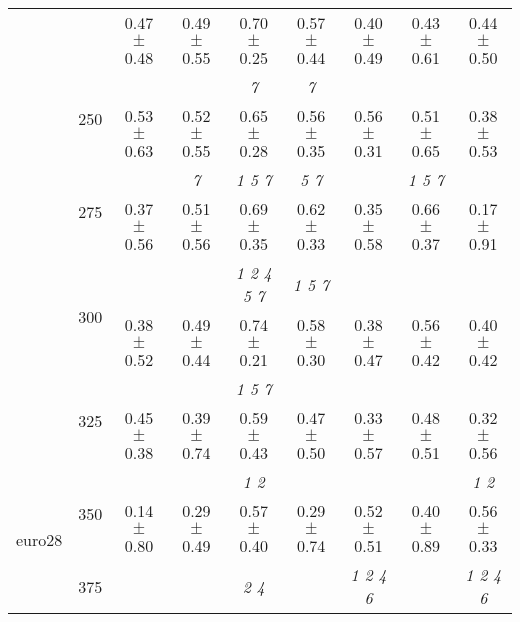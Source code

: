 \begin{table}[h]
{\begin{tabular}{
        ccccccccc}
 & & \cellcolor[HTML]{EFEFEF} 0.47 $\pm$ 0.48& \cellcolor[HTML]{EFEFEF} 0.49 $\pm$ 0.55& \cellcolor[HTML]{EFEFEF} 0.70 $\pm$ 0.25& \cellcolor[HTML]{EFEFEF} 0.57 $\pm$ 0.44& \cellcolor[HTML]{EFEFEF} 0.40 $\pm$ 0.49& \cellcolor[HTML]{EFEFEF} 0.43 $\pm$ 0.61& \cellcolor[HTML]{EFEFEF} 0.44 $\pm$ 0.50 \\ 
 & \multirow{2}{*}{250}& & & \textit{ 7 }& \textit{ 7 }& & &  \\ 
 & & 0.53 $\pm$ 0.63& 0.52 $\pm$ 0.55& 0.65 $\pm$ 0.28& 0.56 $\pm$ 0.35& 0.56 $\pm$ 0.31& 0.51 $\pm$ 0.65& 0.38 $\pm$ 0.53 \\ 
 & \multirow{2}{*}{275}& \cellcolor[HTML]{EFEFEF} & \cellcolor[HTML]{EFEFEF} \textit{ 7 }& \cellcolor[HTML]{EFEFEF} \textit{ 1 5 7 }& \cellcolor[HTML]{EFEFEF} \textit{ 5 7 }& \cellcolor[HTML]{EFEFEF} & \cellcolor[HTML]{EFEFEF} \textit{ 1 5 7 }& \cellcolor[HTML]{EFEFEF}  \\ 
 & & \cellcolor[HTML]{EFEFEF} 0.37 $\pm$ 0.56& \cellcolor[HTML]{EFEFEF} 0.51 $\pm$ 0.56& \cellcolor[HTML]{EFEFEF} 0.69 $\pm$ 0.35& \cellcolor[HTML]{EFEFEF} 0.62 $\pm$ 0.33& \cellcolor[HTML]{EFEFEF} 0.35 $\pm$ 0.58& \cellcolor[HTML]{EFEFEF} 0.66 $\pm$ 0.37& \cellcolor[HTML]{EFEFEF} 0.17 $\pm$ 0.91 \\ 
 & \multirow{2}{*}{300}& & & \textit{ 1 2 4 5 7 }& \textit{ 1 5 7 }& & &  \\ 
 & & 0.38 $\pm$ 0.52& 0.49 $\pm$ 0.44& 0.74 $\pm$ 0.21& 0.58 $\pm$ 0.30& 0.38 $\pm$ 0.47& 0.56 $\pm$ 0.42& 0.40 $\pm$ 0.42 \\ 
 & \multirow{2}{*}{325}& \cellcolor[HTML]{EFEFEF} & \cellcolor[HTML]{EFEFEF} & \cellcolor[HTML]{EFEFEF} \textit{ 1 5 7 }& \cellcolor[HTML]{EFEFEF} & \cellcolor[HTML]{EFEFEF} & \cellcolor[HTML]{EFEFEF} & \cellcolor[HTML]{EFEFEF}  \\ 
 & & \cellcolor[HTML]{EFEFEF} 0.45 $\pm$ 0.38& \cellcolor[HTML]{EFEFEF} 0.39 $\pm$ 0.74& \cellcolor[HTML]{EFEFEF} 0.59 $\pm$ 0.43& \cellcolor[HTML]{EFEFEF} 0.47 $\pm$ 0.50& \cellcolor[HTML]{EFEFEF} 0.33 $\pm$ 0.57& \cellcolor[HTML]{EFEFEF} 0.48 $\pm$ 0.51& \cellcolor[HTML]{EFEFEF} 0.32 $\pm$ 0.56 \\ 
 \multirow{4}{*}{euro28} & \multirow{2}{*}{350}& & & \textit{ 1 2 }& & & & \textit{ 1 2 } \\ 
 & & 0.14 $\pm$ 0.80& 0.29 $\pm$ 0.49& 0.57 $\pm$ 0.40& 0.29 $\pm$ 0.74& 0.52 $\pm$ 0.51& 0.40 $\pm$ 0.89& 0.56 $\pm$ 0.33 \\ 
 & \multirow{2}{*}{375}& \cellcolor[HTML]{EFEFEF} & \cellcolor[HTML]{EFEFEF} & \cellcolor[HTML]{EFEFEF} \textit{ 2 4 }& \cellcolor[HTML]{EFEFEF} & \cellcolor[HTML]{EFEFEF} \textit{ 1 2 4 6 }& \cellcolor[HTML]{EFEFEF} & \cellcolor[HTML]{EFEFEF} \textit{ 1 2 4 6 } \\ 

\end{tabular}}
\end{table}
